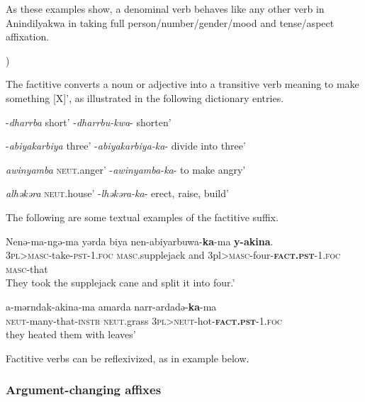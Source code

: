 \documentclass[output=paper]{langscibook}
\begin{document}
As these examples show, a denominal verb behaves like any other verb in Anindilyakwa in taking full person/number/gender/mood and tense/aspect affixation.



\label{sec:vanegmond:2.3.2.2})



The factitive converts a noun or adjective into a transitive verb meaning to make something [X]’, as illustrated in the following dictionary entries.



\ea%
 \label{ex:vanegmond:10}
\ea
\label{ex:vanegmond:10a}
 -\textit{dharrba} short’ -\textit{dharrbu-kwa}- shorten’

\ex
\label{ex:vanegmond:10b}
-\textit{abiyakarbiya} three’ -\textit{abiyakarbiya-ka}- divide into three’

\ex
\label{ex:vanegmond:10c}
\textit{awinyamba} \textsc{neut}.anger’ -\textit{awinyamba-ka}- to make angry’

\ex
\label{ex:vanegmond:10d}
\textit{alhəkəra} \textsc{neut}.house’ -\textit{lhəkəra-ka}- erect, raise, build’
\z
\z



The following are some textual examples of the factitive suffix.



\ea%
 \label{ex:vanegmond:11}

 \ea
 \label{ex:vanegmond:11a}
\gll Nenə-ma-ngə-ma yərda biya nen-abiyarbuwa-\textbf{{ka}}{-ma} \textbf{y-akina}.\\
\textsc{3pl}>\textsc{masc}-take-\textsc{pst}-1.\textsc{foc} \textsc{masc}.supplejack and 3pl>\textsc{masc}-four-\textbf{\textsc{fact}}\textbf{.\textsc{pst}}-1.\textsc{foc} \textsc{masc}-that\\
\glt They took the supplejack cane and split it into four.’

 \ex
 \label{ex:vanegmond:11b}
\gll  a-mərndak-akina-ma amarda narr-ardadə-\textbf{ka}{-ma}\\
\textsc{neut}-many-that-\textsc{instr} \textsc{neut}.grass \textsc{3pl}>\textsc{neut}-hot-\textbf{\textsc{fact}}\textbf{.\textsc{pst}}-1.\textsc{foc}\\
\glt they heated them with leaves’
\z
\z


Factitive verbs can be reflexivized, as in example  below.


\subsubsection{Argument-changing affixes}\label{sec:vanegmond:2.3.3}
\end{document}
